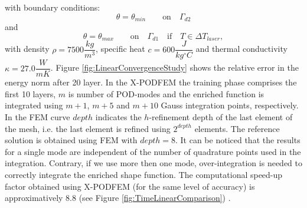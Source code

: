 \documentclass[3p]{article}
\begin{document}
with boundary conditions:
\begin{equation}
	\theta = \theta_{min} \qquad \text{on} \quad \Gamma_{d2}
\end{equation}
and
\begin{equation}
	\theta = \theta_{max} \qquad \text{on} \quad \Gamma_{d1} \quad \text{if} \quad T \in \Delta T_{laser},
\end{equation}
with density $\rho = 7500 \dfrac{kg}{m^{3}}$, specific heat $c = 600 \dfrac{J}{kg^{\circ}C}$ and thermal conductivity $\kappa = 27.0 \dfrac{W}{m K}$.
Figure \ref{fig:LinearConvergenceStudy} shows the relative error in the energy norm after 20 layer. In the X-PODFEM the training phase comprises the first 10 layers, $m$ is number of POD-modes and the enriched function is integrated using $m+1$, $m+5$ and $m+10$ Gauss integration points, respectively. In the FEM curve $depth$ indicates the $h$-refinement depth of the last element of the mesh, i.e. the last element is refined using $2^{depth}$ elements. The reference solution is obtained using FEM with $depth=8$. It can be noticed that the results for a single mode are independent of the number of quadrature points used in the integration. Contrary, if we use more then one mode, over-integration is needed to correctly integrate the enriched shape function. The computational speed-up factor obtained using X-PODFEM (for the same level of accuracy) is approximatively 8.8 (see Figure \ref{fig:TimeLinearComparison}) .
\end{document}
